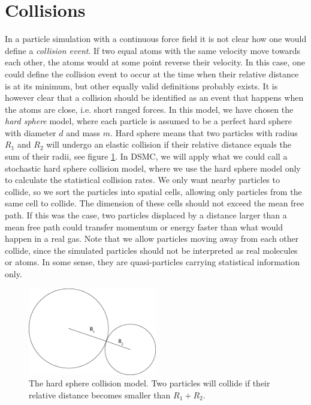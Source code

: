 \section{Collisions}
\label{sec:dsmc_collisions_model}
In a particle simulation with a continuous force field it is not clear how one would define a \textit{collision event}. If two equal atoms with the same velocity move towards each other, the atoms would at some point reverse their velocity. In this case, one could define the collision event to occur at the time when their relative distance is at its minimum, but other equally valid definitions probably exists. It is however clear that a collision should be identified as an event that happens when the atoms are close, i.e. short ranged forces. In this model, we have chosen the \textit{hard sphere} model, where each particle is assumed to be a perfect hard sphere with diameter $d$ and mass $m$. Hard sphere means that two particles with radius $R_1$ and $R_2$ will undergo an elastic collision if their relative distance equals the sum of their radii, see figure \ref{fig:dsmc_hard_sphere}. In DSMC, we will apply what we could call a stochastic hard sphere collision model, where we use the hard sphere model only to calculate the statistical collision rates. We only want nearby particles to collide, so we sort the particles into spatial cells, allowing only particles from the same cell to collide. The dimension of these cells should not exceed the mean free path. If this was the case, two particles displaced by a distance larger than a mean free path could transfer momentum or energy faster than what would happen in a real gas. Note that we allow particles moving away from each other collide, since the simulated particles should not be interpreted as real molecules or atoms. In some sense, they are quasi-particles carrying statistical information only.
\begin{figure}[h]
\begin{center}
\includegraphics[width=0.5\textwidth, trim=0cm 0cm 0cm 0cm, clip]{DSMC/figures/collisions.eps}
\end{center}
\caption{The hard sphere collision model. Two particles will collide if their relative distance becomes smaller than $R_1+R_2$.}
\label{fig:dsmc_hard_sphere}
\end{figure}
